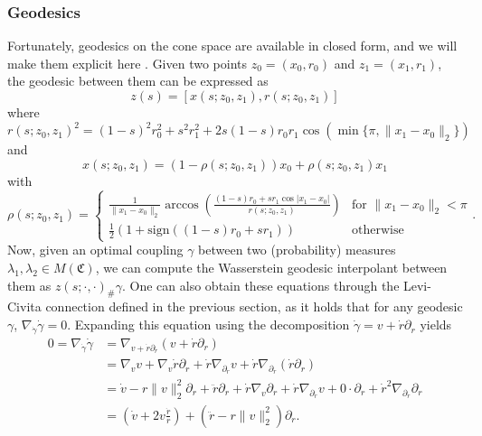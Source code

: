 \documentclass{article}
\begin{document}
\subsubsection{Geodesics}

Fortunately, geodesics on the cone space are available in closed form, and we will make them explicit here \cite{liero2016optimal}. Given two points $z_0 = (x_0, r_0)$ and $z_1 = (x_1, r_1)$, the geodesic between them can be expressed as
\begin{equation} \label{eq: cone geodesics}
    z(s) = \left[x(s; z_0, z_1) , r(s; z_0, z_1)\right]
\end{equation}
where
\begin{equation} \label{eq: cone geodesic radial}
    r(s; z_0, z_1)^2 = (1-s)^2r_0^2 + s^2r_1^2 + 2s(1-s)r_0r_1\cos(\min\{\pi, \|x_1 - x_0\|_{2}\})
\end{equation}
and 
\begin{equation} \label{eq: cone geodesic base}
    x(s; z_0, z_1) = (1 - \rho(s; z_0, z_1))x_0 + \rho(s; z_0, z_1)x_1
\end{equation}
with
\begin{equation}
    \rho(s; z_0, z_1) = \begin{cases}
        \frac{1}{\|x_1 - x_0\|_2}\arccos\left(\frac{(1-s)r_0 + sr_1\cos|x_1 - x_0|}{r(s; z_0, z_1)}\right) & \text{for }\|x_1 - x_0\|_2 < \pi \\
        \frac{1}{2}\left(1 + \text{sign}((1-s)r_0 + sr_1)\right) & \text{otherwise}
    \end{cases}.
\end{equation}
Now, given an optimal coupling $\gamma$ between two (probability) measures $\lambda_1, \lambda_2 \in M(\mathfrak{C})$, we can compute the Wasserstein geodesic interpolant between them as $z(s; \cdot, \cdot)_{\#}\gamma$. One can also obtain these equations through the Levi-Civita connection defined in the previous section, as it holds that for any geodesic $\gamma$, $\nabla_{\dot \gamma}\dot \gamma = 0$. Expanding this equation using the decomposition $\dot \gamma = v + \dot r\partial_r$  yields
\begin{align}
    0 = \nabla_{\dot \gamma}\dot \gamma &= \nabla_{v + \dot r \partial_r}(v + \dot r\partial_r) \\
    &= \nabla_vv + \nabla_v \dot r \partial_r + \dot r \nabla_{\partial_r}v + \dot r \nabla_{\partial_r}(\dot r \partial_r) \\
    &= \dot v - r\|v\|_2^2\partial_r + \ddot r \partial_r + \dot r \nabla_v\partial_r + \dot r \nabla_{\partial_r}v + 0\cdot  \partial_r + \dot r^2 \nabla_{\partial_r}\partial_r \\
    &= \left(\dot v + 2v\frac{\dot r}{r}\right) + \left(\ddot r  - r\|v\|_2^2\right)\partial_r.
\end{align}
\end{document}
